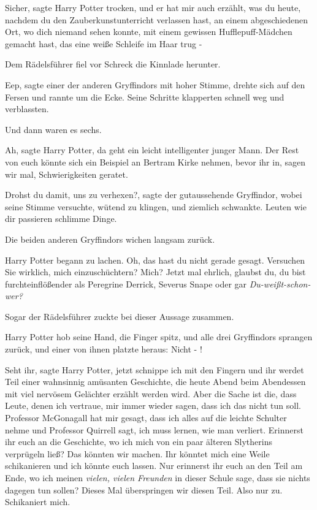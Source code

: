 \glqq{}Sicher\grqq{}, sagte Harry Potter trocken, \glqq{}und er hat mir auch
erzählt, was du heute, nachdem du den Zauberkunstunterricht verlassen hast, an
einem abgeschiedenen Ort, wo dich niemand sehen konnte, mit einem gewissen
Hufflepuff-Mädchen gemacht hast, das eine weiße Schleife im Haar trug -\grqq{}

Dem Rädelsführer fiel vor Schreck die Kinnlade herunter.

\glqq{}Eep\grqq{}, sagte einer der anderen Gryffindors mit hoher Stimme, drehte
sich auf den Fersen und rannte um die Ecke. Seine Schritte klapperten schnell
weg und verblassten.

Und dann waren es sechs.

\glqq{}Ah\grqq{}, sagte Harry Potter, \glqq{}da geht ein leicht intelligenter
junger Mann. Der Rest von euch könnte sich ein Beispiel an Bertram Kirke nehmen,
bevor ihr in, sagen wir mal, Schwierigkeiten geratet.\grqq{}

\glqq{}Drohst du damit, uns zu verhexen?\grqq{}, sagte der gutaussehende
Gryffindor, wobei seine Stimme versuchte, wütend zu klingen, und ziemlich
schwankte. \glqq{}Leuten wie dir passieren schlimme Dinge.\grqq{}

Die beiden anderen Gryffindors wichen langsam zurück.

Harry Potter begann zu lachen. \glqq{}Oh, das hast du nicht gerade gesagt.
Versuchen Sie wirklich, mich einzuschüchtern? Mich? Jetzt mal ehrlich, glaubst
du, du bist furchteinflößender als Peregrine Derrick, Severus Snape oder gar
\emph{Du-weißt-schon-wer?}\grqq{}

Sogar der Rädelsführer zuckte bei dieser Aussage zusammen.

Harry Potter hob seine Hand, die Finger spitz, und alle drei Gryffindors
sprangen zurück, und einer von ihnen platzte heraus: \glqq{}Nicht - !\grqq{}

\glqq{}Seht ihr\grqq{}, sagte Harry Potter, \glqq{}jetzt schnippe ich mit den
Fingern und ihr werdet Teil einer wahnsinnig amüsanten Geschichte, die heute
Abend beim Abendessen mit viel nervösem Gelächter erzählt werden wird. Aber die
Sache ist die, dass Leute, denen ich vertraue, mir immer wieder sagen, dass ich
das nicht tun soll. Professor McGonagall hat mir gesagt, dass ich alles auf die
leichte Schulter nehme und Professor Quirrell sagt, ich muss lernen, wie man
verliert. Erinnerst ihr euch an die Geschichte, wo ich mich von ein paar älteren
Slytherins verprügeln ließ? Das könnten wir machen. Ihr könntet mich eine Weile
schikanieren und ich könnte euch lassen. Nur erinnerst ihr euch an den Teil am
Ende, wo ich meinen \emph{vielen, vielen Freunden} in dieser Schule sage, dass
sie nichts dagegen tun sollen? Dieses Mal überspringen wir diesen Teil. Also nur
zu. Schikaniert mich.\grqq{}

